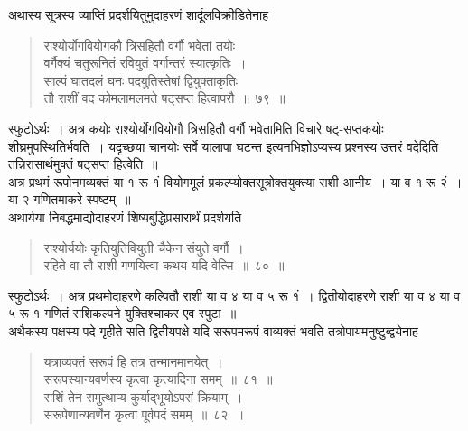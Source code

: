 \documentclass[11pt, openany]{book}
\begin{document}
 अथास्य सूत्रस्य व्याप्तिं प्रदर्शयितुमुदाहरणं शार्दूलविक्रीडितेनाह\textendash 
\begin{quote}
    \ex
      राश्योर्योगवियोगकौ त्रिसहितौ वर्गौ भवेतां तयोः \\
 वर्गैक्यं चतुरूनितं रवियुतं वर्गान्तरं स्यात्कृतिः~। \\
 साल्पं घातदलं घनः पदयुतिस्तेषां द्वियुक्ताकृतिः \\
 तौ राशीं वद कोमलामलमते षट्सप्त हित्वापरौ~॥~७९~॥~
\end{quote}

स्फुटोऽर्थः~। अत्र कयोः राश्योर्योगवियोगौ त्रिसहितौ वर्गौ भवेतामिति 
विचारे षट्-सप्तकयोः शीघ्रमुपस्थितिर्भवति~। यदृच्छया चानयोः सर्वे यालापा
घटन्त इत्यनभिज्ञोऽप्यस्य प्रश्नस्य उत्तरं वदेदिति तन्निरासार्थमुक्तं
षट्सप्त हित्वेति~॥ \\

\vspace{-3mm}
 अत्र प्रथमं रूपोनमव्यक्तं या १ रू १ं वियोगमूलं प्रकल्प्योक्तसूत्रोक्तयुक्त्या राशी आनीय~। या व १ रू २ं~। या २ गणितमाकरे स्पष्टम्~॥ \\

\vspace{-3mm}
 अथार्यया निबद्धमाद्योदाहरणं शिष्यबुद्धिप्रसारार्थं प्रदर्शयति\textendash 
\begin{quote}
    \ex
     राश्योर्ययोः कृतियुतिवियुती चैकेन संयुते वर्गौ~। \\
 रहिते वा तौ राशी गणयित्वा कथय यदि वेत्सि~॥~८०~॥~

\end{quote}


स्फुटोऽर्थः~। अत्र प्रथमोदाहरणे कल्पितौ राशी या व ४ या व ५ रू १ं~। 
द्वितीयोदाहरणे राशी या व ४ या व ५ रू १ गणितं राशिकल्पने 
युक्तिश्चाकर एव स्पुटा~॥ \\

\vspace{-3mm}
 अथैकस्य पक्षस्य पदे गृहीते सति द्वितीयपक्षे यदि सरूपमरूपं 
वाव्यक्तं भवति तत्रोपायमनुष्टुब्द्वयेनाह\textendash 
\begin{quote}
    \bs
     यत्राव्यक्तं सरूपं हि तत्र तन्मानमानयेत्~। \\
 सरूपस्यान्यवर्णस्य कृत्वा कृत्यादिना समम्~॥~८१~॥~\\

\vspace{-5mm}
 राशिं तेन समुत्थाप्य कुर्याद्भूयोऽपरां क्रियाम्~। \\
 सरूपेणान्यवर्णेन कृत्वा पूर्वपदं समम्~॥~८२~॥~
\end{quote}
\end{document}
